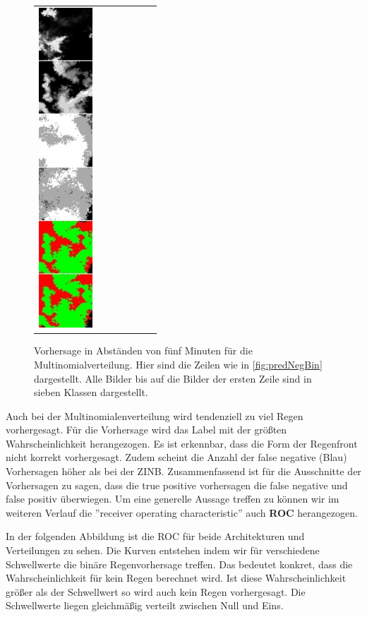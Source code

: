 \begin{figure}[h]
\begin{tabular}{lllllll}
\includegraphics[width=20mm]{abb/prediction/106_cat_maxCont}
\end{tabular}
\caption{Vorhersage in Abständen von fünf Minuten für die Multinomialverteilung. Hier sind die Zeilen wie in \ref{fig:predNegBin} dargestellt. Alle Bilder bis auf die Bilder der ersten Zeile sind in sieben Klassen dargestellt.\label{fig:predCat}}
\end{figure}


\noindent Auch bei der Multinomialenverteilung wird tendenziell zu viel Regen vorhergesagt. Für die Vorhersage wird das Label mit der größten Wahrscheinlichkeit herangezogen. Es ist erkennbar, dass die Form der Regenfront nicht korrekt vorhergesagt. Zudem scheint die Anzahl der false negative (Blau) Vorhersagen höher als bei der ZINB. Zusammenfassend ist für die Ausschnitte der Vorhersagen zu sagen, dass die true positive vorhersagen die false negative und false positiv überwiegen. Um eine generelle Aussage treffen zu können wir im weiteren Verlauf die ''receiver operating characteristic'' auch \textbf{ROC} herangezogen.


\noindent In der folgenden Abbildung ist die ROC für beide Architekturen und Verteilungen zu sehen. Die Kurven entstehen indem wir für verschiedene Schwellwerte die binäre Regenvorhersage treffen. Das bedeutet konkret, dass die Wahrscheinlichkeit für kein Regen berechnet wird. Ist diese Wahrscheinlichkeit größer als der Schwellwert so wird auch kein Regen vorhergesagt.
Die Schwellwerte liegen gleichmäßig verteilt zwischen Null und Eins.


